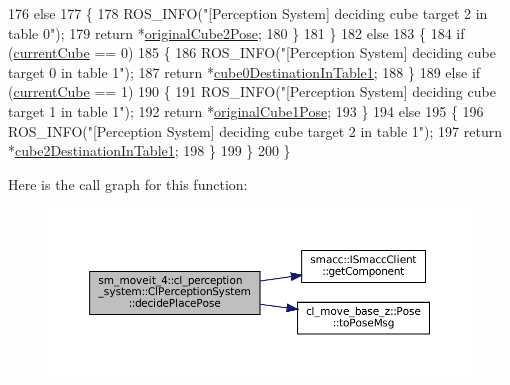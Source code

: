 \begin{DoxyCode}
176             \textcolor{keywordflow}{else}
177             \{
178                 ROS\_INFO(\textcolor{stringliteral}{"[Perception System] deciding cube target 2 in table 0"});
179                 \textcolor{keywordflow}{return} *\hyperlink{classsm__moveit__4_1_1cl__perception__system_1_1ClPerceptionSystem_acdec54d806d67e1452767cc246760267}{originalCube2Pose};
180             \}
181         \}
182         \textcolor{keywordflow}{else}
183         \{
184             \textcolor{keywordflow}{if} (\hyperlink{classsm__moveit__4_1_1cl__perception__system_1_1ClPerceptionSystem_ae2a80b803814af8b3c87f810f2728af0}{currentCube} == 0)
185             \{
186                 ROS\_INFO(\textcolor{stringliteral}{"[Perception System] deciding cube target 0 in table 1"});
187                 \textcolor{keywordflow}{return} *\hyperlink{classsm__moveit__4_1_1cl__perception__system_1_1ClPerceptionSystem_a85778bda89d9d4b741c9b9d066b757c8}{cube0DestinationInTable1};
188             \}
189             \textcolor{keywordflow}{else} \textcolor{keywordflow}{if} (\hyperlink{classsm__moveit__4_1_1cl__perception__system_1_1ClPerceptionSystem_ae2a80b803814af8b3c87f810f2728af0}{currentCube} == 1)
190             \{
191                 ROS\_INFO(\textcolor{stringliteral}{"[Perception System] deciding cube target 1 in table 1"});
192                 \textcolor{keywordflow}{return} *\hyperlink{classsm__moveit__4_1_1cl__perception__system_1_1ClPerceptionSystem_a196b19a5c6c6b745e82947aadecee89d}{originalCube1Pose};
193             \}
194             \textcolor{keywordflow}{else}
195             \{
196                 ROS\_INFO(\textcolor{stringliteral}{"[Perception System] deciding cube target 2 in table 1"});
197                 \textcolor{keywordflow}{return} *\hyperlink{classsm__moveit__4_1_1cl__perception__system_1_1ClPerceptionSystem_a3be34a534f5bb76c7ea43a7f4dcb324e}{cube2DestinationInTable1};
198             \}
199         \}
200     \}
\end{DoxyCode}
Here is the call graph for this function\+:
\nopagebreak
\begin{figure}[H]
\begin{center}
\leavevmode
\includegraphics[width=350pt]{classsm__moveit__4_1_1cl__perception__system_1_1ClPerceptionSystem_ab2431f4f2f48fc474e7b2f868bdec60d_cgraph}
\end{center}
\end{figure}
